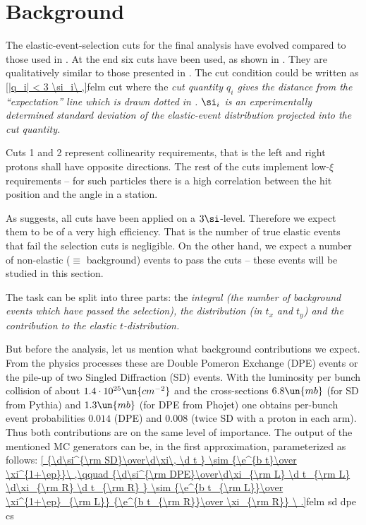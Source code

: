 \section[felm bckg]{Background}

The elastic-event-selection cuts for the final analysis have evolved compared to those used in . At the end six cuts have been used, as shown in . They are qualitatively similar to those presented in . The cut condition could be written as
\eqref{|q_i| < 3 \si_i\ ,}{felm cut}
where the \em{cut quantity} $q_i$ gives the distance from the ``expectation'' line which is drawn dotted in . $\si_i$ is an experimentally determined standard deviation of the elastic-event distribution projected into the cut quantity.

Cuts 1 and 2 represent collinearity requirements, that is the left and right protons shall have opposite directions. The rest of the cuts implement low-$\xi$ requirements -- for such particles there is a high correlation between the hit position and the angle in a station.


As  suggests, all cuts have been applied on a $3\si$-level. Therefore we expect them to be of a very high efficiency. That is the number of true elastic events that fail the selection cuts is negligible. On the other hand, we expect a number of non-elastic ($\equiv$ background) events to pass the cuts -- these events will be studied in this section.

The task can be split into three parts: the \em{integral} (the number of background events which have passed the selection), the \em{distribution} (in $t_x$ and $t_y$) and the \em{contribution to the elastic $t$-distribution}.

But before the analysis, let us mention what background contributions we expect. From the physics processes these are Double Pomeron Exchange (DPE) events or the pile-up of two Singled Diffraction (SD) events. With the luminosity per bunch collision of about $1.4\cdot10^{25}\un{cm^{-2}}$ and the cross-sections $6.8\un{mb}$ (for SD from Pythia) and $1.3\un{mb}$ (for DPE from Phojet) one obtains per-bunch event probabilities $0.014$ (DPE) and $0.008$ (twice SD with a proton in each arm). Thus both contributions are on the same level of importance. The output of the mentioned MC generators can be, in the first approximation, parameterized as follows:
\eqref{
{\d\si^{\rm SD}\over\d\xi\, \d t } \sim {\e^{b t}\over \xi^{1+\ep}}\ ,\qquad
{\d\si^{\rm DPE}\over\d\xi_{\rm L} \d t_{\rm L} \d\xi_{\rm R} \d t_{\rm R} } \sim {\e^{b t_{\rm L}}\over \xi^{1+\ep}_{\rm L}} {\e^{b t_{\rm R}}\over \xi_{\rm R}}
\ .}{felm sd dpe cs}

